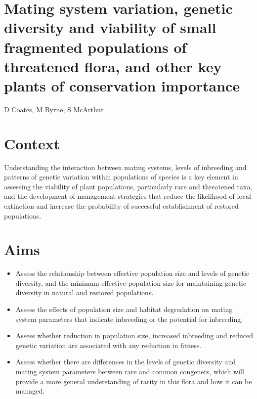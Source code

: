 \documentclass[version=last,
    paper=a4, %
    10pt, %
    usenames,
    dvipsnames,
    oneside, %
    headings=openany, %
    DIV=15 %
]{scrbook}
\begin{document}
\section*{Mating system variation, genetic diversity and viability of small
fragmented populations of threatened flora, and other key plants of
conservation importance
}

D Coates, M Byrne, S McArthur


\section*{Context}
Understanding the interaction between mating systems, levels of
inbreeding and patterns of genetic variation within populations of
species is a key element in assessing the viability of plant
populations, particularly rare and threatened taxa, and the development
of management strategies that reduce the likelihood of local extinction
and increase the probability of successful establishment of restored
populations.



\section*{Aims}
\begin{itemize}
\itemsep1pt\parskip0pt
\item
  Assess the relationship between effective population size and levels
  of genetic diversity, and the minimum effective population size for
  maintaining genetic diversity in natural and restored populations.
\item
  Assess the effects of population size and habitat degradation on
  mating system parameters that indicate inbreeding or the potential for
  inbreeding.
\item
  Assess whether reduction in population size, increased inbreeding and
  reduced genetic variation are associated with any reduction in
  fitness.
\item
  Assess whether there are differences in the levels of genetic
  diversity and mating system parameters between rare and common
  congeners, which will provide a more general understanding of rarity
  in this flora and how it can be managed.
\end{itemize}
\end{document}
